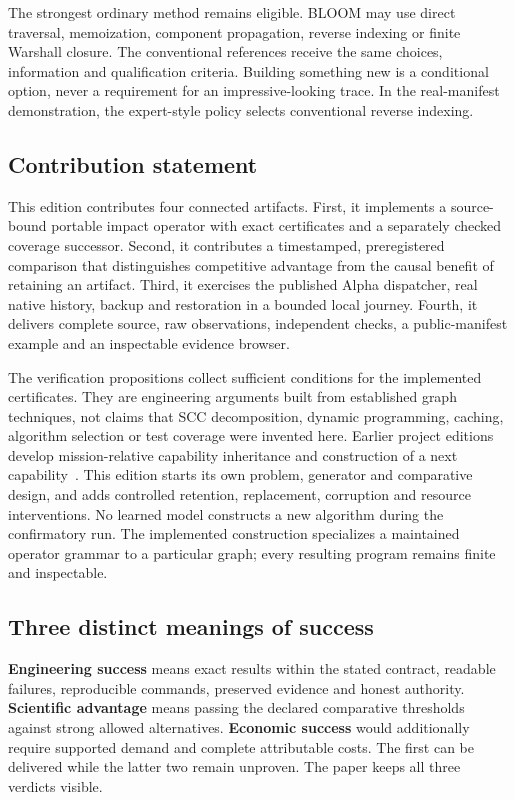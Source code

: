 \documentclass[11pt,letterpaper]{article}
\begin{document}
The strongest ordinary method remains eligible. BLOOM may use direct traversal, memoization, component propagation, reverse indexing or finite Warshall closure. The conventional references receive the same choices, information and qualification criteria. Building something new is a conditional option, never a requirement for an impressive-looking trace. In the real-manifest demonstration, the expert-style policy selects conventional reverse indexing.

\subsection{Contribution statement}
This edition contributes four connected artifacts. First, it implements a source-bound portable impact operator with exact certificates and a separately checked coverage successor. Second, it contributes a timestamped, preregistered comparison that distinguishes competitive advantage from the causal benefit of retaining an artifact. Third, it exercises the published Alpha dispatcher, real native history, backup and restoration in a bounded local journey. Fourth, it delivers complete source, raw observations, independent checks, a public-manifest example and an inspectable evidence browser.

The verification propositions collect sufficient conditions for the implemented certificates. They are engineering arguments built from established graph techniques, not claims that SCC decomposition, dynamic programming, caching, algorithm selection or test coverage were invented here. Earlier project editions develop mission-relative capability inheritance and construction of a next capability~\cite{montrealai2026writer4,montrealai2026writer5}. This edition starts its own problem, generator and comparative design, and adds controlled retention, replacement, corruption and resource interventions. No learned model constructs a new algorithm during the confirmatory run. The implemented construction specializes a maintained operator grammar to a particular graph; every resulting program remains finite and inspectable.

\subsection{Three distinct meanings of success}
\textbf{Engineering success} means exact results within the stated contract, readable failures, reproducible commands, preserved evidence and honest authority. \textbf{Scientific advantage} means passing the declared comparative thresholds against strong allowed alternatives. \textbf{Economic success} would additionally require supported demand and complete attributable costs. The first can be delivered while the latter two remain unproven. The paper keeps all three verdicts visible.
\end{document}
